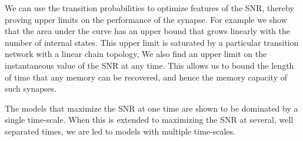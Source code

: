 \documentclass[12pt]{article}
\begin{document}
We can use the transition probabilities to optimize features of the SNR, thereby proving upper limits on the performance of the synapse.
For example we show that the area under the curve has an upper bound that grows linearly with the number of internal states.
This upper limit is saturated by a particular transition network with a linear chain topology,
We also find an upper limit on the instantaneous value of the SNR at any time.
This allows us to bound the length of time that any memory can be recovered, and hence the memory capacity of such synapses.

The models that maximize the SNR at one time are shown to be dominated by a single time-scale.
When this is extended to maximizing the SNR at several, well separated times, we are led to models with multiple time-scales.




%
\end{document}
